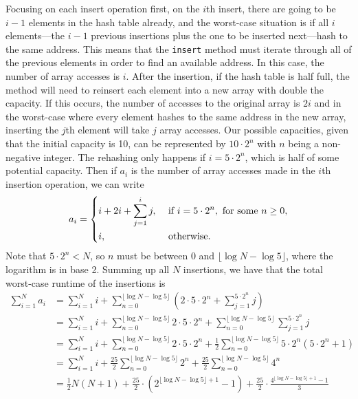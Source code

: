 \documentclass[11pt]{article}
\begin{document}
    Focusing on each insert operation first, on the \(i\)th insert, there are going to be \(i-1\) elements in the hash table already, and the worst-case situation is if all \(i\) elements---the \(i-1\) previous insertions plus the one to be inserted next---hash to the same address. This means that the \texttt{insert} method must iterate through all of the previous elements in order to find an available address. In this case, the number of array accesses is \(i\). After the insertion, if the hash table is half full, the method will need to reinsert each element into a new array with double the capacity. If this occurs, the number of accesses to the original array is \(2i\) and in the worst-case where every element hashes to the same address in the new array, inserting the \(j\)th element will take \(j\) array accesses. Our possible capacities, given that the initial capacity is 10, can be represented by \(10 \cdot 2^n\) with \(n\) being a non-negative integer. The rehashing only happens if \(i = 5 \cdot 2^n\), which is half of some potential capacity. Then if \(a_i\) is the number of array accesses made in the \(i\)th insertion operation, we can write
    \[
        a_i = \begin{dcases}
            i + 2i + \sum_{j=1}^{i} j, &\text{ if } i = 5 \cdot 2^n, \text{ for some }  n \geq 0,\\
            i, &\text{ otherwise} .
        \end{dcases}
    \]
    Note that \(5\cdot 2^n < N\), so \(n\) must be between 0 and \(\lfloor\log N - \log 5\rfloor\), where the logarithm is in base 2. Summing up all \(N\) insertions, we have that the total worst-case runtime of the insertions is
    \begin{align*}
        \sum_{i=1}^{N} a_i &= \sum_{i=1}^{N} i + \sum_{n=0}^{\lfloor \log N  - \log 5 \rfloor} \left( 2\cdot 5\cdot 2^n + \sum_{j=1}^{5 \cdot 2^n} j \right) \\
        &= \sum_{i=1}^{N} i + \sum_{n=0}^{\lfloor \log N - \log 5\rfloor} 2\cdot 5\cdot 2^n + \sum_{n=0}^{\lfloor \log N - \log 5\rfloor}\sum_{j=1}^{5 \cdot 2^n} j \\
        &= \sum_{i=1}^{N} i + \sum_{n=0}^{\lfloor \log N - \log 5\rfloor} 2\cdot 5\cdot 2^n + \frac{1}{2}\sum_{n=0}^{\lfloor \log N - \log 5\rfloor} 5\cdot 2^n(5 \cdot 2^n + 1) \\
        &=\sum_{i=1}^{N} i + \frac{25}{2} \sum_{n=0}^{\lfloor \log N - \log 5\rfloor} 2^n + \frac{25}{2}\sum_{n=0}^{\lfloor \log N - \log 5\rfloor} 4^n \\
        &= \frac{1}{2}N(N+1)+\frac{25}{2} \cdot (2^{\lfloor \log N - \log 5\rfloor + 1} - 1) + \frac{25}{2} \cdot \frac{4^{\lfloor \log N - \log 5\rfloor + 1} - 1}{3}
    \end{align*}
\end{document}
